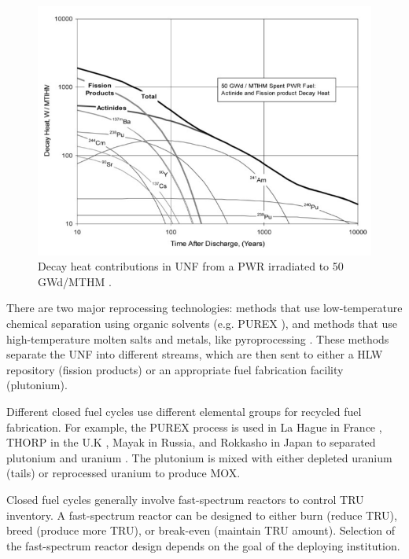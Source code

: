 \begin{figure}[htbp!]
	\begin{center}
		\includegraphics[scale=0.3]{./images/decay_heat.png}
	\end{center}
	\caption{Decay heat contributions in \gls{UNF} from a \gls{PWR} irradiated
		to 50 GWd/MTHM \cite{wigeland_separations_2006}.}
	\label{fig:decay_heat}
\end{figure}


There are two major reprocessing technologies:
methods that use low-temperature chemical separation
using organic solvents (e.g. PUREX \cite{baumgaertner_purex_1976}), and
methods that use high-temperature molten salts and metals, like pyroprocessing
\cite{laidler_development_1997}. These methods separate the \gls{UNF}
into different streams, which are then sent to either a \gls{HLW} repository
(fission products) or an appropriate fuel fabrication facility (plutonium).

Different closed fuel cycles use different elemental groups for recycled
fuel fabrication. For example, the PUREX process is used in La Hague in France
\cite{schneider_spent_2008}, THORP in the U.K \cite{riley_technology_1998},
Mayak in Russia, and Rokkasho in Japan to separated plutonium and uranium
\cite{birkett_recent_2005}. The plutonium is mixed with either depleted
uranium (tails) or reprocessed uranium to produce \gls{MOX}. 

Closed fuel cycles 
generally involve fast-spectrum reactors to control TRU inventory.
A fast-spectrum reactor can be designed to either burn (reduce TRU),
breed (produce more TRU), or break-even (maintain TRU amount).
Selection of the fast-spectrum reactor design depends on the 
goal of the deploying institution.

